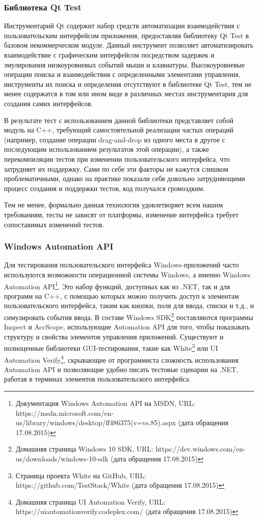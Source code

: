 \documentclass[conference]{IEEEtran}
\begin{document}
\subsubsection{Библиотека Qt Test}
Инструментарий Qt содержит набор средств автоматизации взаимодействия с пользовательским интерфейсом приложения, 
предоставляя библиотеку Qt Test в базовом некоммерческом модуле. Данный инструмент позволяет автоматизировать 
взаимодействие с графическим интерфейсом посредством задержек и эмулирования низкоуровневых событий мыши 
и клавиатуры. Высокоуровневые операции поиска и взаимодействия с определенными элементами управления, инструменты 
их поиска и определения отсутствуют в библиотеке Qt Test, тем не менее содержатся в том или ином виде в 
различных местах инструментария для создания самих интерфейсов. 

В результате тест с использованием данной библиотеки представляет собой модуль на C++, требующий самостоятельной 
реализации частых операций (например, создание операции drag-and-drop из одного места в другое с последующим 
использованием результатов этой операции), а также перекомпиляции тестов при изменении пользовательского 
интерфейса, что затрудняет их поддержку. Сами по себе эти факторы не кажутся слишком проблематичными, 
однако на практике показали себя довольно затрудняющими процесс создания и поддержки тестов, код получался громоздким.

Тем не менее, формально данная технология удовлетворяет всем нашим требованиям, тесты не зависят от платформы, 
изменение интерфейса требует сопоставимых изменений тестов.

\subsubsection{Windows Automation API}
Для тестирования пользовательского интерфейса Windows-приложений часто используются возможности операционной 
системы Windows, а именно Windows Automation API\footnote{Документация Windows Automation API на MSDN, 
URL: https://msdn.microsoft.com/en-us/library/windows/desktop/ff486375(v=vs.85).aspx (дата обращения 17.08.2015)}. 
Это набор функций, доступных как из .NET, так и для программ на C++, с помощью которых можно получить 
доступ к элементам пользовательского интерфейса, таким как кнопки, поля для ввода, списки и т.д., и симулировать 
события ввода. В составе Windows SDK\footnote{Домашняя страница Windows 10 SDK, URL: https://dev.windows.com/en-us/downloads/windows-10-sdk (дата обращения 17.08.2015)} 
поставляются программы Inspect и AccScope, использующие Automation API для того, чтобы показывать структуру 
и свойства элементов управления приложений. Существуют и полноценные библиотеки GUI-тестирования, такие как 
White\footnote{Страница проекта White на GitHub, URL: https://github.com/TestStack/White (дата обращения 17.08.2015)} 
или UI Automation Verify\footnote{Домашняя страница UI Automation Verify, URL: https://uiautomationverify.codeplex.com/ (дата обращения 17.08.2015)}, 
скрывающие от программиста сложность использования Automation API и позволяющие удобно писать тестовые 
сценарии на .NET, работая в терминах элементов пользовательского интерфейса.
\end{document}
